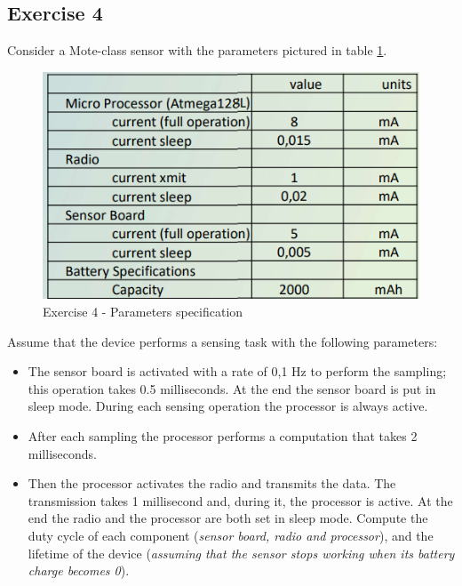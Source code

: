 \documentclass[10pt,a4paper]{report}
\theoremstyle{definition}
\begin{document}
\subsection{Exercise 4}
\label{sec:exercise-4}
Consider a Mote-class sensor with the parameters pictured in table \ref{energy-ex4}.
\begin{figure}
	\centering\includegraphics[scale=0.50]{images/Pasted image 20230328174646.png}
	\caption{Exercise 4 - Parameters specification}
	\label{energy-ex4}
\end{figure}


Assume that the device performs a sensing task with the following parameters:
\begin{itemize}
	\item 
	The sensor board is activated with a rate of 0,1 Hz to perform the sampling; this operation takes 0.5 milliseconds. At the end the sensor board is put in sleep mode. During each sensing operation the processor is always active.
	\item 
	After each sampling the processor performs a computation that takes 2 milliseconds.
	\item 
	Then the processor activates the radio and transmits the data. The transmission takes 1 millisecond and, during it, the processor is active. At the end the radio and the processor are both set in sleep mode.
	Compute the duty cycle of each component (\textit{sensor board, radio and processor}), and the lifetime of the device (\textit{assuming that the sensor stops working when its battery charge becomes 0}).
\end{itemize}
\end{document}
